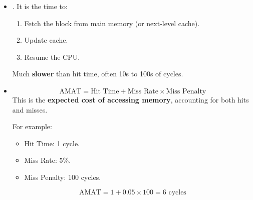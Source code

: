 \begin{itemize}
    \item {}. It is the time to:
    \begin{enumerate}
        \item Fetch the block from main memory (or next-level cache).
        \item Update cache.
        \item Resume the CPU.
    \end{enumerate}
    Much \textbf{slower} than hit time, often 10s to 100s of cycles.


    \item {}
    \begin{equation}
        \text{AMAT} = \text{Hit Time} + \text{Miss Rate} \times \text{Miss Penalty}
    \end{equation}
    This is the \textbf{expected cost of accessing memory}, accounting for both hits and misses.
    \begin{examplebox}
        For example:
        \begin{itemize}
            \item Hit Time: 1 cycle.
            \item Miss Rate: 5\%.
            \item Miss Penalty: 100 cycles.
        \end{itemize}
        \begin{equation*}
            \text{AMAT} = 1 + 0.05 \times 100 = 6 \text{ cycles}
        \end{equation*}
    \end{examplebox}
\end{itemize}